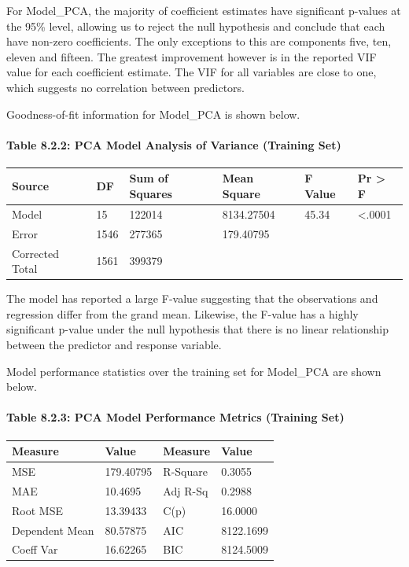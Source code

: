 \documentclass[]{article}
\let\oldparagraph\paragraph
\renewcommand{\paragraph}[1]{\oldparagraph{#1}\mbox{}}
\begin{document}
For Model\_PCA, the majority of coefficient estimates have significant
p-values at the 95\% level, allowing us to reject the null hypothesis
and conclude that each have non-zero coefficients. The only exceptions
to this are components five, ten, eleven and fifteen. The greatest
improvement however is in the reported VIF value for each coefficient
estimate. The VIF for all variables are close to one, which suggests no
correlation between predictors.

Goodness-of-fit information for Model\_PCA is shown below.

\paragraph{Table 8.2.2: PCA Model Analysis of Variance (Training
Set)}\label{table-8.2.2-pca-model-analysis-of-variance-training-set}

\begin{longtable}[]{@{}llllll@{}}
\toprule
Source & DF & Sum of Squares & Mean Square & F Value & Pr \textgreater{}
F\tabularnewline
\midrule
\endhead
Model & 15 & 122014 & 8134.27504 & 45.34 &
\textless{}.0001\tabularnewline
Error & 1546 & 277365 & 179.40795 & &\tabularnewline
Corrected Total & 1561 & 399379 & & &\tabularnewline
\bottomrule
\end{longtable}

The model has reported a large F-value suggesting that the observations
and regression differ from the grand mean. Likewise, the F-value has a
highly significant p-value under the null hypothesis that there is no
linear relationship between the predictor and response variable.

Model performance statistics over the training set for Model\_PCA are
shown below.

\paragraph{Table 8.2.3: PCA Model Performance Metrics (Training
Set)}\label{table-8.2.3-pca-model-performance-metrics-training-set}

\begin{longtable}[]{@{}llll@{}}
\toprule
Measure & Value & Measure & Value\tabularnewline
\midrule
\endhead
MSE & 179.40795 & R-Square & 0.3055\tabularnewline
MAE & 10.4695 & Adj R-Sq & 0.2988\tabularnewline
Root MSE & 13.39433 & C(p) & 16.0000\tabularnewline
Dependent Mean & 80.57875 & AIC & 8122.1699\tabularnewline
Coeff Var & 16.62265 & BIC & 8124.5009\tabularnewline
\bottomrule
\end{longtable}
\end{document}
